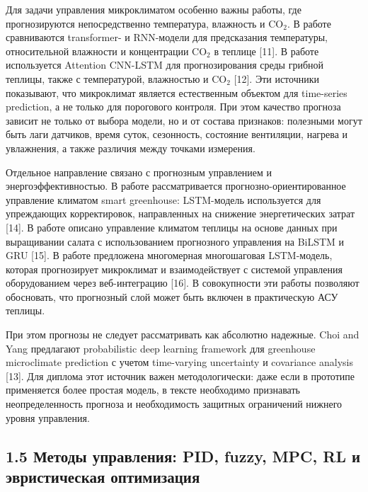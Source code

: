 \documentclass[a4paper,14pt]{extarticle}
\begin{document}
Для задачи управления микроклиматом особенно важны работы, где
прогнозируются непосредственно температура, влажность и CO\(_2\). В
работе сравниваются transformer- и RNN-модели для предсказания
температуры, относительной влажности и концентрации CO\(_2\) в теплице
{[}11{]}. В работе используется Attention CNN-LSTM для прогнозирования
среды грибной теплицы, также с температурой, влажностью и CO\(_2\)
{[}12{]}. Эти источники показывают, что микроклимат является
естественным объектом для time-series prediction, а не только для
порогового контроля. При этом качество прогноза зависит не только от
выбора модели, но и от состава признаков: полезными могут быть лаги
датчиков, время суток, сезонность, состояние вентиляции, нагрева и
увлажнения, а также различия между точками измерения.

Отдельное направление связано с прогнозным управлением и
энергоэффективностью. В работе рассматривается прогнозно-ориентированное
управление климатом smart greenhouse: LSTM-модель используется для
упреждающих корректировок, направленных на снижение энергетических
затрат {[}14{]}. В работе описано управление климатом теплицы на основе
данных при выращивании салата с использованием прогнозного управления на
BiLSTM и GRU {[}15{]}. В работе предложена многомерная многошаговая
LSTM-модель, которая прогнозирует микроклимат и взаимодействует с
системой управления оборудованием через веб-интеграцию {[}16{]}. В
совокупности эти работы позволяют обосновать, что прогнозный слой может
быть включен в практическую АСУ теплицы.

При этом прогнозы не следует рассматривать как абсолютно надежные. Choi
and Yang предлагают probabilistic deep learning framework для greenhouse
microclimate prediction с учетом time-varying uncertainty и covariance
analysis {[}13{]}. Для диплома этот источник важен методологически: даже
если в прототипе применяется более простая модель, в тексте необходимо
признавать неопределенность прогноза и необходимость защитных
ограничений нижнего уровня управления.

\hypertarget{ux43cux435ux442ux43eux434ux44b-ux443ux43fux440ux430ux432ux43bux435ux43dux438ux44f-pid-fuzzy-mpc-rl-ux438-ux44dux432ux440ux438ux441ux442ux438ux447ux435ux441ux43aux430ux44f-ux43eux43fux442ux438ux43cux438ux437ux430ux446ux438ux44f}{%
\subsection{1.5 Методы управления: PID, fuzzy, MPC, RL и эвристическая
оптимизация}\label{ux43cux435ux442ux43eux434ux44b-ux443ux43fux440ux430ux432ux43bux435ux43dux438ux44f-pid-fuzzy-mpc-rl-ux438-ux44dux432ux440ux438ux441ux442ux438ux447ux435ux441ux43aux430ux44f-ux43eux43fux442ux438ux43cux438ux437ux430ux446ux438ux44f}}
\end{document}
